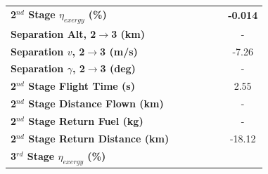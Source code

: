 \begin{table}[ht]
\begin{tabular}{l c c c c c c}
	\hline 
	\textbf{2$^{nd}$ Stage $\eta_{exergy}$ (\%)}
	& \textbf{\secondExergyEffmSPARTANNinety}
	& \textbf{\secondExergyEffmSPARTANNinetyFive}
	& \textbf{\secondExergyEffmSPARTANStandard}
	& \textbf{\secondExergyEffmSPARTANOneHundredFive}
	& \textbf{\secondExergyEffmSPARTANOneHundredTen}
	& \textbf{-0.014}
	\\
	\textbf{Separation Alt, 2$\rightarrow$3 (km)}
	& \secondthirdSeparationAltmSPARTANNinety
	& \secondthirdSeparationAltmSPARTANNinetyFive
	& \secondthirdSeparationAltmSPARTANStandard
	& \secondthirdSeparationAltmSPARTANOneHundredFive
	& \secondthirdSeparationAltmSPARTANOneHundredTen
	& -
	\\
	\textbf{Separation $v$, 2$\rightarrow$3 (m/s)}
	& \secondthirdSeparationvmSPARTANNinety
	& \secondthirdSeparationvmSPARTANNinetyFive
	& \secondthirdSeparationvmSPARTANStandard
	& \secondthirdSeparationvmSPARTANOneHundredFive
	& \secondthirdSeparationvmSPARTANOneHundredTen
	&-7.26
	\\
	\textbf{Separation $\gamma$, 2$\rightarrow$3 (deg)}
	& \secondthirdSeparationgammamSPARTANNinety
	& \secondthirdSeparationgammamSPARTANNinetyFive
	& \secondthirdSeparationgammamSPARTANStandard
	& \secondthirdSeparationgammamSPARTANOneHundredFive
	& \secondthirdSeparationgammamSPARTANOneHundredTen
	& -
	\\
	\textbf{2$^{nd}$ Stage Flight Time (s)}
	& \secondFlightTimemSPARTANNinety
	& \secondFlightTimemSPARTANNinetyFive
	& \secondFlightTimemSPARTANStandard
	& \secondFlightTimemSPARTANOneHundredFive
	& \secondFlightTimemSPARTANOneHundredTen
	&2.55
	\\
	\textbf{2$^{nd}$ Stage Distance Flown (km)}
	& \SecondDistmSPARTANNinety
	& \SecondDistmSPARTANNinetyFive
	& \SecondDistmSPARTANStandard
	& \SecondDistmSPARTANOneHundredFive
	& \SecondDistmSPARTANOneHundredTen
	& -
	\\
	\textbf{2$^{nd}$ Stage Return Fuel (kg)}
	& \returnFuelmSPARTANNinety
	& \returnFuelmSPARTANNinetyFive
	& \returnFuelmSPARTANStandard
	& \returnFuelmSPARTANOneHundredFive
	& \returnFuelmSPARTANOneHundredTen
	& -
	\\
	\textbf{2$^{nd}$ Stage Return Distance (km)}
	& \returnDistmSPARTANNinety
	& \returnDistmSPARTANNinetyFive
	& \returnDistmSPARTANStandard
	& \returnDistmSPARTANOneHundredFive
	& \returnDistmSPARTANOneHundredTen
	&-18.12
	\\
	\hline 
	\textbf{3$^{rd}$ Stage $\eta_{exergy}$ (\%)}
	& \textbf{\thirddExergyEffmSPARTANNinety}
	& \textbf{\thirddExergyEffmSPARTANNinetyFive}
	& \textbf{\thirddExergyEffmSPARTANStandard}

\end{tabular}
\end{table}
